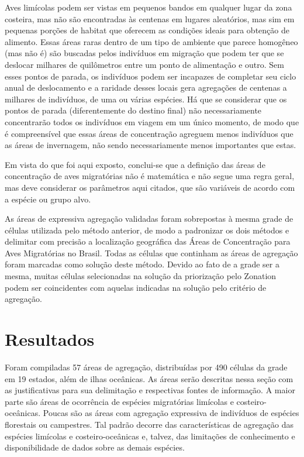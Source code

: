 \documentclass[
  oneside]{scrbook}
\begin{document}
Aves limícolas podem ser vistas em pequenos bandos em qualquer lugar da zona costeira, mas não são encontradas às centenas em lugares aleatórios, mas sim em pequenas porções de habitat que oferecem as condições ideais para obtenção de alimento. Essas áreas raras dentro de um tipo de ambiente que parece homogêneo (mas não é) são buscadas pelos indivíduos em migração que podem ter que se deslocar milhares de quilômetros entre um ponto de alimentação e outro. Sem esses pontos de parada, os indivíduos podem ser incapazes de completar seu ciclo anual de deslocamento e a raridade desses locais gera agregações de centenas a milhares de indivíduos, de uma ou várias espécies. Há que se considerar que os pontos de parada (diferentemente do destino final) não necessariamente concentrarão todos os indivíduos em viagem em um único momento, de modo que é compreensível que essas áreas de concentração agreguem menos indivíduos que as áreas de invernagem, não sendo necessariamente menos importantes que estas.

Em vista do que foi aqui exposto, conclui-se que a definição das áreas de concentração de aves migratórias não é matemática e não segue uma regra geral, mas deve considerar os parâmetros aqui citados, que são variáveis de acordo com a espécie ou grupo alvo.

As áreas de expressiva agregação validadas foram sobrepostas à mesma grade de células utilizada pelo método anterior, de modo a padronizar os dois métodos e delimitar com precisão a localização geográfica das Áreas de Concentração para Aves Migratórias no Brasil. Todas as células que continham as áreas de agregação foram marcadas como solução deste método. Devido ao fato de a grade ser a mesma, muitas células selecionadas na solução da priorização pelo Zonation podem ser coincidentes com aquelas indicadas na solução pelo critério de agregação.

\hypertarget{resultados-1}{%
\section{Resultados}\label{resultados-1}}

Foram compiladas 57 áreas de agregação, distribuídas por 490 células da grade em 19 estados, além de ilhas oceânicas. As áreas serão descritas nessa seção com as justificativas para sua delimitação e respectivas fontes de informação. A maior parte são áreas de ocorrência de espécies migratórias limícolas e costeiro-oceânicas. Poucas são as áreas com agregação expressiva de indivíduos de espécies florestais ou campestres. Tal padrão decorre das características de agregação das espécies limícolas e costeiro-oceânicas e, talvez, das limitações de conhecimento e disponibilidade de dados sobre as demais espécies.
\end{document}
